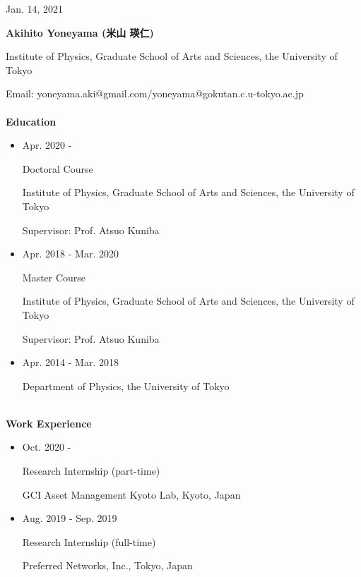 \documentclass[dvipdfmx]{jsarticle}
\begin{document}
%
%
%
%
\begin{flushright}
Jan. 14, 2021
\end{flushright}
%
%
%
%
{\bf\Large Akihito Yoneyama (米山 瑛仁)}
\vspace{3mm}
\par
Institute of Physics, Graduate School of Arts and Sciences, the University of Tokyo
\par
Email: yoneyama.aki@gmail.com/yoneyama@gokutan.c.u-tokyo.ac.jp
%
%
%
%
{\ }\\\\
\vspace{3mm}
{\bf\large Education}
\vspace{-6mm}
\\\hrulefill
\begin{itemize}
\item
Apr. 2020 - 
\par
Doctoral Course
\par
Institute of Physics, Graduate School of Arts and Sciences, the University of Tokyo
\par
Supervisor: Prof. Atsuo Kuniba
\item
Apr. 2018 - Mar. 2020
\par
Master Course
\par
Institute of Physics, Graduate School of Arts and Sciences, the University of Tokyo
\par
Supervisor: Prof. Atsuo Kuniba
\item
Apr. 2014 - Mar. 2018
\par
Department of Physics, the University of Tokyo
\end{itemize}
%
%
%
%
{\ }\\
\vspace{3mm}
{\bf\large Work Experience}
\vspace{-6mm}
\\\hrulefill
\begin{itemize}
\item
Oct. 2020 - 
\par
Research Internship (part-time)
\par
GCI Asset Management Kyoto Lab, Kyoto, Japan
%
%
\item
Aug. 2019 - Sep. 2019
\par
Research Internship (full-time)
\par
Preferred Networks, Inc., Tokyo, Japan
\end{itemize}
\end{document}

